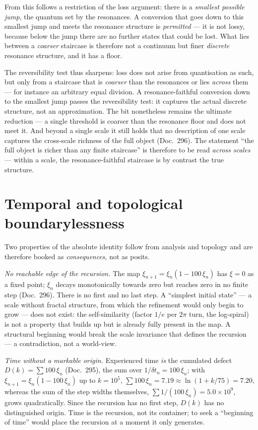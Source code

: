From this follows a restriction of the loss argument: there is a \emph{smallest
possible jump}, the quantum set by the resonances. A conversion that goes down to
this smallest jump and meets the resonance structure is \emph{permitted} --- it
is not lossy, because below the jump there are no further states that could be
lost. What lies between a \emph{coarser} staircase is therefore not a continuum
but finer \emph{discrete} resonance structure, and it has a floor.

The reversibility test thus sharpens: loss does not arise from quantisation as
such, but only from a staircase that is \emph{coarser} than the resonances or lies
\emph{across} them --- for instance an arbitrary equal division. A
resonance-faithful conversion down to the smallest jump passes the reversibility
test: it captures the actual discrete structure, not an approximation. The bit
nonetheless remains the ultimate reduction --- a single threshold is coarser than
the resonance floor and does not meet it. And beyond a single scale it still
holds that no description of one scale captures the cross-scale richness of the
full object (Doc.~296). The statement \enquote{the full object is richer than any
finite staircase} is therefore to be read \emph{across scales} --- within a scale,
the resonance-faithful staircase is by contrast the true structure.

\section{Temporal and topological boundarylessness}

Two properties of the absolute identity follow from analysis and topology and are
therefore booked as \emph{consequences}, not as posits.

\emph{No reachable edge of the recursion.} The map
$\xi_{n+1}=\xi_n(1-100\,\xi_n)$ has $\xi=0$ as a fixed point; $\xi_n$ decays
monotonically towards zero but reaches zero in no finite step (Doc.~296). There is
no first and no last step. A \enquote{simplest initial state} --- a scale without
fractal structure, from which the refinement would only begin to grow --- does not
exist: the self-similarity (factor $1/e$ per $2\pi$ turn, the log-spiral) is not a
property that builds up but is already fully present in the map. A structural
beginning would break the scale invariance that defines the recursion --- a
contradiction, not a world-view.

\emph{Time without a markable origin.} Experienced time \emph{is} the cumulated
defect $D(k)=\sum 100\,\xi_n$ (Doc.~295), the sum over
$1/\delta t_n = 100\,\xi_n$; with $\xi_{n+1}=\xi_n(1-100\,\xi_n)$ up to
$k = 10^5$, $\sum 100\,\xi_n = 7.19 \approx \ln(1+k/75) = 7.20$, whereas the sum
of the step widths themselves, $\sum 1/(100\,\xi_n) = 5.0\times10^9$, grows
quadratically. Since the recursion has no first step, $D(k)$ has no
distinguished origin. Time is the recursion, not its container; to seek a
\enquote{beginning of time} would place the recursion at a moment it only
generates.

